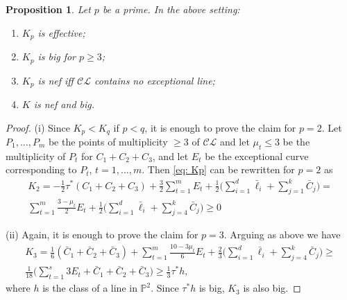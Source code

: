 \documentclass[12pt]{amsart}
\theoremstyle{plain}
\newtheorem{proposition}[thm]{Proposition}
\theoremstyle{definition}
\newcommand\pp[1]{\todo[color=cyan!50]{#1}} %
\renewcommand\ge{\geqslant}
\renewcommand\le{\leqslant}
\newcommand\CL{\mathcal{CL}}
\renewcommand\pp{\mathbb P}
\begin{document}
\begin{proposition}\label{prop: positivity} Let $p$ be a prime. In the above setting: 
\begin{enumerate} 
\item $K_p$ is effective;
\item $K_p$ is big for $p\ge 3$;
\item $K_p$ is nef iff $\CL$ contains no exceptional line; 
\item $K$ is nef and big.
\end{enumerate}
\end{proposition}
\begin{proof}
(i) Since $K_p<K_q$ if $p<q$, it is enough to prove the claim for $p=2$. Let  $P_1,\dots, P_m$  be the points of multiplicity $\ge 3$ of $\CL$ and let $\mu_t\le 3$ be the multiplicity of $P_t$ for $C_1+C_2+C_3$, and let $E_t$ be the exceptional curve corresponding to $P_t$, $t=1,\dots, m$.  Then \eqref{eq: Kp} can be rewritten for $p=2$ as 
\begin{gather*}
K_2= -\frac12\tau^*(C_1+C_2+C_3)+\frac 32\sum_{t=1}^m E_t+\frac{1}{2}\bigg(\sum_{i=1}^d\bar \ell_i+\sum_{j=1}^k\bar C_j \bigg)=\\
\sum_{t=1}^m \frac{3-\mu_t}{2} E_t+\frac{1}{2}\bigg(\sum_{i=1}^d\bar \ell_i+\sum_{j=4}^k\bar C_j \bigg) \ge 0
\end{gather*}
\medskip

(ii) Again, it is enough to prove the claim for $p=3$. Arguing as above we have 
\begin{gather*}
K_3=\frac 16 (\bar C_1+\bar C_2+\bar C_3)+\sum_{t=1}^m\frac{10-3\mu_t}{6} E_t+\frac{2}{3}\bigg(\sum_{i=1}^d\bar \ell_i+\sum_{j=4}^k\bar C_j \bigg)\ge \\
\frac {1}{18} \bigg(\sum_{t=1}^s 3 E_t + \bar C_1+\bar C_2+\bar C_3 \bigg)\ge\frac 1 3 \tau^*h,
\end{gather*}
where $h$ is the class of a line in $\pp^2$. Since $\tau^*h$ is big, $K_3$ is also big.
\medskip


\end{proof}
\end{document}
